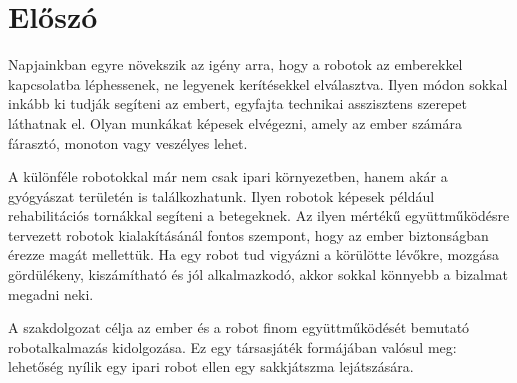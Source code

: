 \documentclass[../documentation.tex]{subfiles}
\begin{document}
\section{Előszó}
Napjainkban egyre növekszik az igény arra, hogy a robotok az emberekkel kapcsolatba léphessenek, ne legyenek kerítésekkel elválasztva. Ilyen módon sokkal inkább ki tudják segíteni az embert, egyfajta technikai asszisztens szerepet láthatnak el. Olyan munkákat képesek elvégezni, amely az ember számára fárasztó, monoton vagy veszélyes lehet. 

A különféle robotokkal már nem csak ipari környezetben, hanem akár a gyógyászat területén is találkozhatunk. Ilyen robotok képesek például rehabilitációs tornákkal segíteni a betegeknek. Az ilyen mértékű együttműködésre tervezett robotok kialakításánál fontos szempont, hogy az ember biztonságban érezze magát mellettük. Ha egy robot tud vigyázni a körülötte lévőkre, mozgása gördülékeny, kiszámítható és jól alkalmazkodó, akkor sokkal könnyebb a bizalmat megadni neki.

A szakdolgozat célja az ember és a robot finom együttműködését bemutató robotalkalmazás kidolgozása. Ez egy társasjáték formájában valósul meg: lehetőség nyílik egy ipari robot ellen egy sakkjátszma lejátszására.
\end{document}
